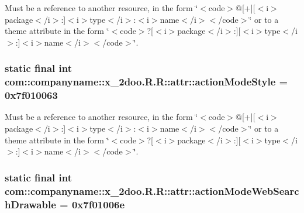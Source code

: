 Must be a reference to another resource, in the form \char`\"{}$<$code$>$@\mbox{[}+\mbox{]}\mbox{[}$<$i$>$package$<$/i$>$:\mbox{]}$<$i$>$type$<$/i$>$:$<$i$>$name$<$/i$>$$<$/code$>$\char`\"{} or to a theme attribute in the form \char`\"{}$<$code$>$?\mbox{[}$<$i$>$package$<$/i$>$:\mbox{]}\mbox{[}$<$i$>$type$<$/i$>$:\mbox{]}$<$i$>$name$<$/i$>$$<$/code$>$\char`\"{}. \hypertarget{classcom_1_1companyname_1_1x__2doo_1_1_r_1_1attr_becb542b358a8863281dc71b4a221f70}{
\subsubsection[{actionModeStyle}]{\setlength{\rightskip}{0pt plus 5cm}static final int com::companyname::x\_\-2doo.R.R::attr::actionModeStyle = 0x7f010063}}
\label{classcom_1_1companyname_1_1x__2doo_1_1_r_1_1attr_becb542b358a8863281dc71b4a221f70}


Must be a reference to another resource, in the form \char`\"{}$<$code$>$@\mbox{[}+\mbox{]}\mbox{[}$<$i$>$package$<$/i$>$:\mbox{]}$<$i$>$type$<$/i$>$:$<$i$>$name$<$/i$>$$<$/code$>$\char`\"{} or to a theme attribute in the form \char`\"{}$<$code$>$?\mbox{[}$<$i$>$package$<$/i$>$:\mbox{]}\mbox{[}$<$i$>$type$<$/i$>$:\mbox{]}$<$i$>$name$<$/i$>$$<$/code$>$\char`\"{}. \hypertarget{classcom_1_1companyname_1_1x__2doo_1_1_r_1_1attr_01c7f17f1c5edcb3f7cb0a957be4b754}{
\subsubsection[{actionModeWebSearchDrawable}]{\setlength{\rightskip}{0pt plus 5cm}static final int com::companyname::x\_\-2doo.R.R::attr::actionModeWebSearchDrawable = 0x7f01006e}}
\label{classcom_1_1companyname_1_1x__2doo_1_1_r_1_1attr_01c7f17f1c5edcb3f7cb0a957be4b754}


